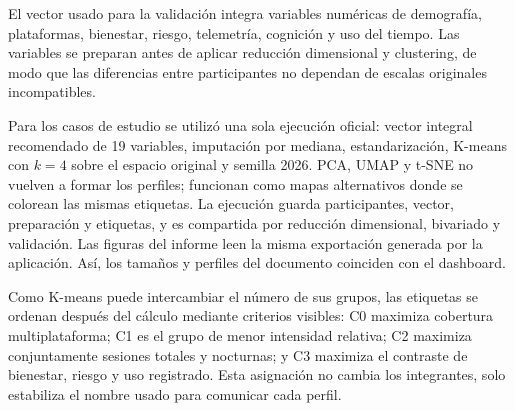 \documentclass[12pt,a4paper]{article}
\begin{document}
El vector usado para la validaci\'on integra variables num\'ericas de demograf\'ia, plataformas, bienestar, riesgo, telemetr\'ia, cognici\'on y uso del tiempo. Las variables se preparan antes de aplicar reducci\'on dimensional y clustering, de modo que las diferencias entre participantes no dependan de escalas originales incompatibles.

Para los casos de estudio se utiliz\'o una sola ejecuci\'on oficial: vector integral recomendado de 19 variables, imputaci\'on por mediana, estandarizaci\'on, K-means con $k=4$ sobre el espacio original y semilla 2026. PCA, UMAP y t-SNE no vuelven a formar los perfiles; funcionan como mapas alternativos donde se colorean las mismas etiquetas. La ejecuci\'on guarda participantes, vector, preparaci\'on y etiquetas, y es compartida por reducci\'on dimensional, bivariado y validaci\'on. Las figuras del informe leen la misma exportaci\'on generada por la aplicaci\'on. As\'i, los tama\~nos y perfiles del documento coinciden con el dashboard.

Como K-means puede intercambiar el n\'umero de sus grupos, las etiquetas se ordenan despu\'es del c\'alculo mediante criterios visibles: C0 maximiza cobertura multiplataforma; C1 es el grupo de menor intensidad relativa; C2 maximiza conjuntamente sesiones totales y nocturnas; y C3 maximiza el contraste de bienestar, riesgo y uso registrado. Esta asignaci\'on no cambia los integrantes, solo estabiliza el nombre usado para comunicar cada perfil.
\end{document}
